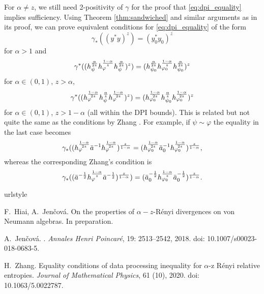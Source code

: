 \documentclass[12pt]{article}
\theoremstyle{definition}
\theoremstyle{remark}
\def\ffi{\varphi}
\begin{document}
For $\alpha\ne z$, we still need 2-positivity of $\gamma$ for the proof that
\eqref{eq:dpi_equality} implies sufficiency. Using Theorem \ref{thm:sandwiched} and
similar arguments as in its proof, we can prove equivalent conditions for
\eqref{eq:dpi_equality} of the form 
\[
\gamma_*((y^*y)^z)=(y_0^*y_0)^z
\]
for $\alpha>1$ and
\[
\gamma^*((h_\psi^{\alpha\over 2z}h_\ffi^{1-\alpha\over z}h_\psi^{\alpha\over
2z})^z)=(h_{\psi_0}^{\alpha\over 2z}h_{\ffi_0}^{1-\alpha\over z}h_{\psi_0}^{\alpha\over 2z})^z
\]
for $\alpha\in (0,1)$, $z>\alpha$,
\[
\gamma^*((h_\ffi^{1-\alpha\over 2z}h_\psi^{\alpha\over z}h_\ffi^{1-\alpha\over
2z})^z)=(h_{\ffi_0}^{1-\alpha\over 2z}h_{\psi_0}^{\alpha\over z}h_{\ffi_0}^{1-\alpha\over 2z})^z
\]
for $\alpha\in (0,1)$, $z>1-\alpha$ (all within the DPI bounds).
This is related but not quite the same as the conditions by Zhang
\cite{zhang2020equality}. For example, if $\psi\sim\ffi$ the equality in the last case
becomes
\[
\gamma_*((h_\ffi^{1-\alpha\over2z}\bar
a^{-1}h_\ffi^{1-\alpha\over2z})^{z\over 1-\alpha}=(h_{\ffi_0}^{1-\alpha\over2z}\bar
a_0^{-1}h_{\ffi_0}^{1-\alpha\over2z})^{z\over 1-\alpha},
\]
whereas the corresponding Zhang's condition is
\[
\gamma_*((\bar a^{-\frac12}h_\ffi^{1-\alpha\over z}\bar a^{-\frac12})^{z\over 1-\alpha})=
(\bar a_0^{-\frac12}h_{\ffi_0}^{1-\alpha\over z}\bar a_0^{-\frac12})^{z\over 1-\alpha}.
\]

%
%

\begin{thebibliography}{2}
\providecommand{\natexlab}[1]{#1}
\providecommand{\url}[1]{\texttt{#1}}
\expandafter\ifx\csname urlstyle\endcsname\relax
  \providecommand{\doi}[1]{doi: #1}\else
  \providecommand{\doi}{doi: \begingroup \urlstyle{rm}\Url}\fi

F.~Hiai, A.~Jen\v cov\'a. On the properties of $\alpha-z$-R\'enyi divergences on von
Neumann algebras. In preparation.

A.~Jen{\v c}ov{\'a}.
.
\newblock \emph{Annales Henri Poincar{\'e}}, 19: 2513--2542, 2018.
\newblock \doi{10.1007/s00023-018-0683-5}.

H.~Zhang.
\newblock Equality conditions of data processing inequality for $\alpha$-z
  R{\'e}nyi relative entropies.
\newblock \emph{Journal of Mathematical Physics}, 61 (10), 2020.
\newblock \doi{10.1063/5.0022787}.

\end{thebibliography}
\end{document}
